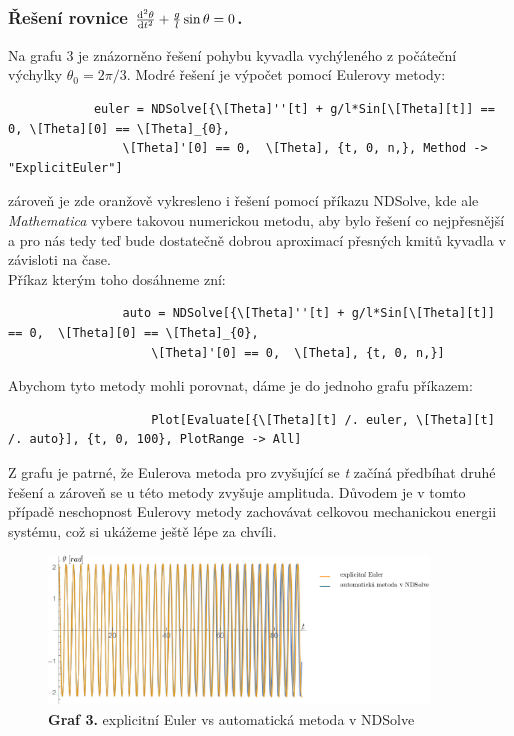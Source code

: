 \documentclass[reqno, a4paper]{amsart}
\begin{document}
		\subsubsection{Řešení rovnice \textit{$\frac{\mathrm{d}^2 {\theta}}{\mathrm{d} {t}^2} + \frac{g}{l} \sin \theta = 0$}.}Na grafu 3 je znázorněno řešení pohybu kyvadla vychýleného z počáteční výchylky $\theta_{0}=2\pi/3$. Modré řešení je výpočet pomocí Eulerovy metody: 
		\begin{verbatim}
			euler = NDSolve[{\[Theta]''[t] + g/l*Sin[\[Theta][t]] == 0, \[Theta][0] == \[Theta]_{0}, 
				\[Theta]'[0] == 0,  \[Theta], {t, 0, n,}, Method -> "ExplicitEuler"]
			\end{verbatim}
			zároveň je zde oranžově vykresleno i řešení pomocí příkazu NDSolve, kde ale \textit{Mathematica} vybere takovou numerickou metodu, aby bylo řešení co nejpřesnější a pro nás tedy teď bude dostatečně dobrou aproximací přesných kmitů kyvadla v závisloti na čase. 
			\\
			Příkaz kterým toho dosáhneme zní:
			\begin{verbatim}
				auto = NDSolve[{\[Theta]''[t] + g/l*Sin[\[Theta][t]] == 0, 	\[Theta][0] == \[Theta]_{0}, 
					\[Theta]'[0] == 0,  \[Theta], {t, 0, n,}]
				\end{verbatim}	
				Abychom tyto metody mohli porovnat, dáme je do jednoho grafu příkazem:
				\begin{verbatim}
					Plot[Evaluate[{\[Theta][t] /. euler, \[Theta][t] /. auto}], {t, 0, 100}, PlotRange -> All]
				\end{verbatim}	
				Z grafu je patrné, že Eulerova metoda pro zvyšující se \textit{t} začíná předbíhat druhé řešení a zároveň se u  této metody zvyšuje amplituda. Důvodem je v tomto případě neschopnost Eulerovy metody zachovávat celkovou mechanickou energii systému, což si ukážeme ještě lépe za chvíli.
				\begin{figure}[h]
					\centering
					\includegraphics[width=0.9\textwidth]{vs}
					\caption*{\textbf{Graf 3.} explicitní Euler vs automatická metoda v NDSolve}  
				\end{figure}
				\\
				\\
\end{document}
